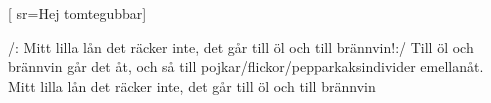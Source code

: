 [ 						
	sr={Hej tomtegubbar}]	
	
\beginverse*						
/: Mitt lilla lån det räcker inte, det går till öl och till brännvin!:/
Till öl och brännvin går det åt, 
och så till pojkar/flickor/pepparkaksindivider emellanåt.
Mitt lilla lån det räcker inte, 
det går till öl och till brännvin
\endverse				
\endsong		
